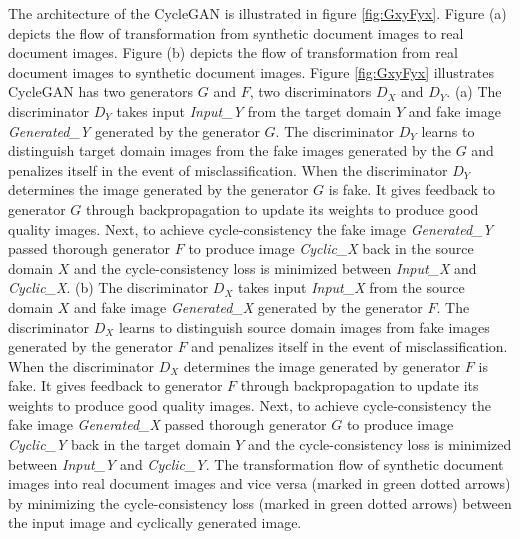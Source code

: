 The architecture of the \ac{CycleGAN} is illustrated in figure \ref{fig:GxyFyx}. Figure (a) depicts the flow of transformation from synthetic document images to real document images. Figure (b) depicts the flow of transformation from real document images to synthetic document images. Figure \ref{fig:GxyFyx} illustrates \ac{CycleGAN} has two generators $G$ and $F$, two discriminators $D_X$ and $D_Y$. (a) The discriminator $D_Y$ takes input \textit{Input\_Y} from the target domain $Y$ and fake image \textit{Generated\_Y} generated by the generator $G$. The discriminator $D_Y$ learns to distinguish target domain images from the fake images generated by the $G$ and penalizes itself in the event of misclassification. When the discriminator $D_Y$ determines the image generated by the generator $G$ is fake. It gives feedback to generator $G$ through backpropagation to update its weights to produce good quality images. Next, to achieve cycle-consistency the fake image \textit{Generated\_Y} passed thorough generator $F$ to produce image \textit{Cyclic\_X} back in the source domain $X$ and the cycle-consistency loss is minimized between \textit{Input\_X} and \textit{Cyclic\_X}. (b) The discriminator $D_X$ takes input \textit{Input\_X} from the source domain $X$ and fake image \textit{Generated\_X} generated by the generator $F$. The discriminator $D_X$ learns to distinguish source domain images from fake images generated by the generator $F$ and penalizes itself in the event of misclassification. When the discriminator $D_X$ determines the image generated by generator $F$ is fake. It gives feedback to generator $F$ through backpropagation to update its weights to produce good quality images. Next, to achieve cycle-consistency the fake image \textit{Generated\_X} passed thorough generator $G$ to produce image \textit{Cyclic\_Y} back in the target domain $Y$ and the cycle-consistency loss is minimized between \textit{Input\_Y} and \textit{Cyclic\_Y}. The transformation flow of synthetic document images into real document images and vice versa (marked in green dotted arrows) by minimizing the cycle-consistency loss (marked in green dotted arrows) between the input image and cyclically generated image. 





